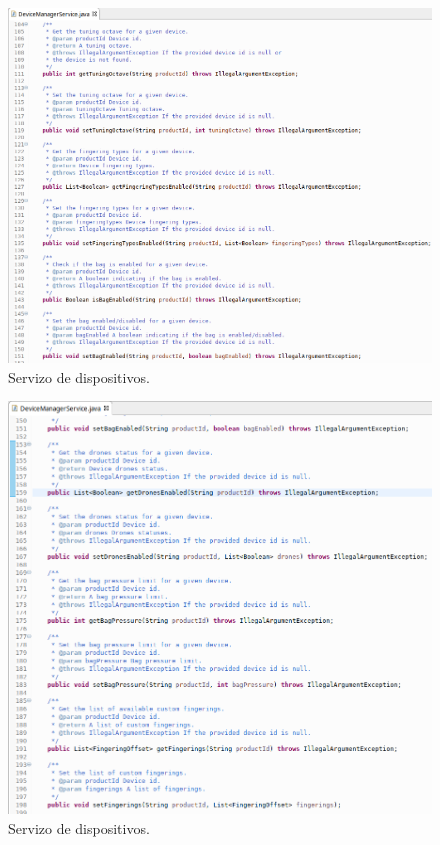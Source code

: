    \begin{figure}[htbp]
    \centering
    \includegraphics[scale=0.6, keepaspectratio=true]{./imagenes/servizo-dispositivos-3.png}
    \caption{Servizo de dispositivos.}
    \label{figura:ServizoDispositivos3}
   \end{figure}
   
   \begin{figure}[htbp]
    \centering
    \includegraphics[scale=0.6, keepaspectratio=true]{./imagenes/servizo-dispositivos-4.png}
    \caption{Servizo de dispositivos.}
    \label{figura:ServizoDispositivos4}
   \end{figure}
   
